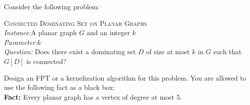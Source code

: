 \documentclass{article}
\begin{document}
\begin{exercise}
    Consider the following problem:
    \begin{mdframed} \textsc{Connected Dominating Set on Planar Graphs} \\
        \textit{Instance:}A planar graph $G$ and an integer $k$\\
\textit{Parameter:}$k$\\
\textit{Question:} Does there exist a dominating set $D$ of size at most $k$ in $G$ such that $G[D]$ is connected?
  \end{mdframed}
  Design an FPT or a kernelization algorithm for this problem. You are allowed to use the following fact as a black box:\\
  \textbf{Fact:} Every planar graph has a vertex of degree at most 5.
\end{exercise}
\end{document}
